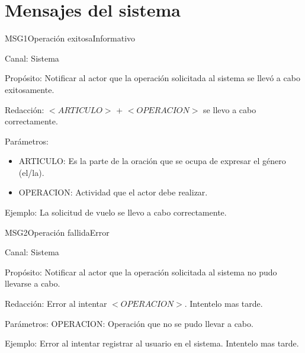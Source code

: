 %

\section{Mensajes del sistema}


\begin{mensaje}{MSG1}{Operación exitosa}{Informativo}
	\item[Canal:] Sistema
	\item[Propósito:] Notificar al actor que la operación solicitada al sistema se llevó a cabo exitosamente.
	\item[Redacción:] $<ARTICULO>$ + $<OPERACION>$ se llevo a cabo correctamente.
	\item[Parámetros:] \cdtEmpty
	\begin{itemize}
		\item ARTICULO: Es la parte de la oración que se ocupa de expresar el género (el/la).
		\item OPERACION: Actividad que el actor debe realizar.
	\end{itemize}
	\item[Ejemplo:] La solicitud de vuelo se llevo a cabo correctamente.
\end{mensaje}

\begin{mensaje}{MSG2}{Operación fallida}{Error}
	\item[Canal:] Sistema
	\item[Propósito:] Notificar al actor que la operación solicitada al sistema no pudo llevarse a cabo.
	\item[Redacción:] Error al intentar $<OPERACION>$. Intentelo mas tarde.
	\item[Parámetros:] OPERACION: Operación que no se pudo llevar a cabo.
	\item[Ejemplo:] Error al intentar registrar al usuario en el sistema. Intentelo mas tarde.
\end{mensaje}

